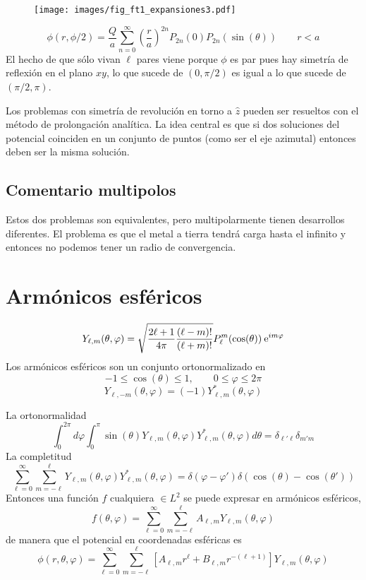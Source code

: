 \documentclass[10pt,oneside]{CBFT_book}
\begin{document}
\begin{figure}[htb]
	\begin{center}
	\texttt{[image: images/fig\_ft1\_expansiones3.pdf]}	 
	\end{center}
	\caption{}
\end{figure} 

\[
	\phi(r,\phi/2) = \frac{Q}{a} \sum_{n=0}^\infty \left( \frac{r}{a}\right)^{2n} P_{2n} (0) P_{2n} 
	(\sin(\theta)) \qquad r < a
\]
El hecho de que sólo vivan $\ell$ pares viene porque $\phi$ es par pues hay simetría de reflexión en el
plano $xy$, lo que sucede de $(0,\pi/2)$ es igual a lo que sucede de $(\pi/2, \pi)$.

Los problemas con simetría de revolución en torno a $\hat{z}$ pueden ser resueltos con el método de
prolongación analítica. La idea central es que si dos soluciones del potencial coinciden en un conjunto
de puntos (como ser el eje azimutal) entonces deben ser la misma solución.

\subsection{Comentario multipolos}

Estos dos problemas son equivalentes, pero multipolarmente tienen desarrollos diferentes.
El problema es que el metal a tierra tendrá carga hasta el infinito y entonces no podemos tener un
radio de convergencia.


\section{Armónicos esféricos}

\[
	Y_{\ell,m}(\theta,\varphi) = \sqrt{ \frac{ 2\ell + 1}{4\pi} \frac{(\ell-m)! }{(\ell+ m)! } }
	P_\ell^m(\cos(\theta)) \:\mathrm{e}^{i m \varphi}
\]
Los armónicos esféricos son un conjunto ortonormalizado en 
\[
	- 1 \leq \cos(\theta) \leq 1 , \qquad 0 \leq \varphi \leq 2\pi
\]
\[
	Y_{\ell,-m}(\theta,\varphi) = (-1) Y_{\ell,m}^*(\theta,\varphi)
\]

La ortonormalidad
\[
	\int_0^{2\pi} d\varphi \int_0^\pi \sin(\theta) Y_{\ell,m}(\theta,\varphi) Y_{\ell,m}^*(\theta,\varphi) d\theta 
	= \delta_{\ell'\ell}\delta_{m'm}
\]
La completitud
\[
	\sum_{\ell=0}^\infty \sum_{m=-\ell}^\ell Y_{\ell,m}(\theta,\varphi) Y_{\ell,m}^*(\theta,\varphi) = 
\delta(\varphi 	-\varphi') \delta(\cos(\theta)-\cos(\theta'))
\]
Entonces una función $f$ cualquiera $\in L^2$ se puede expresar en armónicos esféricos,
\[
	f(\theta,\varphi) = \sum_{\ell=0}^\infty \sum_{m=-\ell}^\ell A_{\ell,m} Y_{\ell,m}(\theta,\varphi)
\]
de manera que el potencial en coordenadas esféricas es
\[
	\phi(r,\theta,\varphi) = \sum_{\ell=0}^\infty \sum_{m=-\ell}^\ell [A_{\ell,m}r^\ell + B_{\ell,m} r^{-(\ell+1)}] 
	Y_{\ell,m}(\theta,\varphi)
\]
\end{document}
